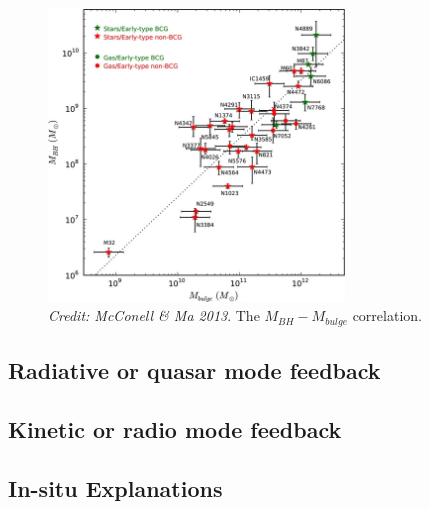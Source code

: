 \begin{figure}
\centering
\includegraphics[width=0.7\textwidth]{figures/02-outflows/mbulge.jpg}
\caption
{
{\sl Credit: McConell \& Ma 2013}. 
The $M_{BH}-M_{bulge}$ correlation.
} 
\label{fig:mbulge}
\end{figure}

\subsection{Radiative or quasar mode feedback}

\subsection{Kinetic or radio mode feedback}

\subsection{In-situ Explanations}


